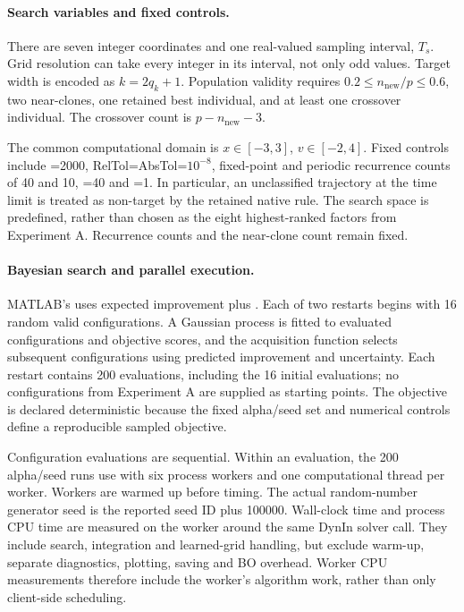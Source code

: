 \begin{bluerevision}
\paragraph{Search variables and fixed controls.}
There are seven integer coordinates and one real-valued sampling interval, $T_s$. Grid resolution can take every integer in its interval, not only odd values. Target width is encoded as $k=2q_k+1$. Population validity requires $0.2\leq n_{\mathrm{new}}/p\leq0.6$, two near-clones, one retained best individual, and at least one crossover individual. The crossover count is $p-n_{\mathrm{new}}-3$.

The common computational domain is $x\in[-3,3]$, $v\in[-2,4]$. Fixed controls include =2000, RelTol=AbsTol=$10^{-8}$, fixed-point and periodic recurrence counts of 40 and 10, =40 and =1. In particular, an unclassified trajectory at the time limit is treated as non-target by the retained native rule. The search space is predefined, rather than chosen as the eight highest-ranked factors from Experiment A. Recurrence counts and the near-clone count remain fixed.

\paragraph{Bayesian search and parallel execution.}
MATLAB's  uses expected improvement plus \cite{ref16,ref17}. Each of two restarts begins with 16 random valid configurations. A Gaussian process is fitted to evaluated configurations and objective scores, and the acquisition function selects subsequent configurations using predicted improvement and uncertainty. Each restart contains 200 evaluations, including the 16 initial evaluations; no configurations from Experiment A are supplied as starting points. The objective is declared deterministic because the fixed alpha/seed set and numerical controls define a reproducible sampled objective.

Configuration evaluations are sequential. Within an evaluation, the 200 alpha/seed runs use  with six process workers and one computational thread per worker. Workers are warmed up before timing. The actual random-number generator seed is the reported seed ID plus 100000. Wall-clock time and process CPU time are measured on the worker around the same DynIn solver call. They include search, integration and learned-grid handling, but exclude warm-up, separate diagnostics, plotting, saving and BO overhead. Worker CPU measurements therefore include the worker's algorithm work, rather than only client-side scheduling.


\end{bluerevision}
